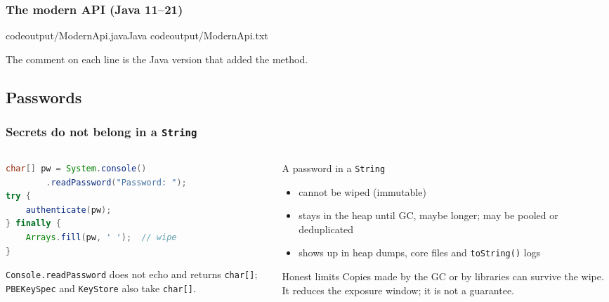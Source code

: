 \documentclass[aspectratio=169,10pt,compress]{beamer}
\begin{document}
\begin{frame}[t,fragile] \frametitle{The modern  API (Java 11--21)}

	\lstcodeoverlaystep
		[basicstyle=\ttfamily\scriptsize]
		[basicstyle=\ttfamily\scriptsize][0.28\textwidth]{12.0cm,2.25cm}
			{codeoutput/ModernApi.java}{Java}
			{codeoutput/ModernApi.txt}

  \vspace{0.2em}
  \small The comment on each line is the Java version that added the method.
\end{frame}


\subsection[Passwords]{Passwords}




\begin{frame}[t,fragile] \frametitle{Secrets do not belong in a \texttt{String}}
  \begin{columns}[T]
    \begin{column}{0.5\textwidth}


\begin{lstlisting}[style=codesnippet, language=Java]
char[] pw = System.console()
        .readPassword("Password: ");
try {
    authenticate(pw);
} finally {
    Arrays.fill(pw, ' ');  // wipe
}
\end{lstlisting}



      \small \texttt{Console.readPassword} does not echo and returns \texttt{char[]};
      \texttt{PBEKeySpec} and \texttt{KeyStore} also take \texttt{char[]}.
    \end{column}
    \begin{column}{0.46\textwidth}
      \small A password in a \texttt{String}
      \begin{itemize}\small
        \item cannot be wiped (immutable)
        \item stays in the heap until GC, maybe longer; may be pooled or deduplicated
        \item shows up in heap dumps, core files and \texttt{toString()} logs
      \end{itemize}
      \begin{alertblock}{Honest limits}
        \small Copies made by the GC or by libraries can survive the wipe. It reduces the exposure window; it is not a guarantee.
      \end{alertblock}
    \end{column}
  \end{columns}
\end{frame}
\end{document}
